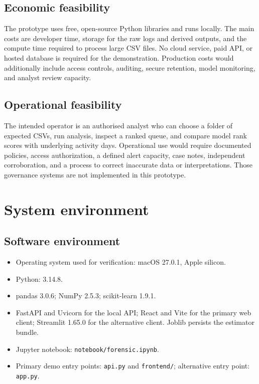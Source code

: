 \documentclass[12pt,a4paper,oneside]{report}
\begin{document}
\subsection{Economic feasibility}
The prototype uses free, open-source Python libraries and runs locally.
The main costs are developer time, storage for the raw logs and derived
outputs, and the compute time required to process large CSV files. No
cloud service, paid API, or hosted database is required for the
demonstration. Production costs would additionally include access
controls, auditing, secure retention, model monitoring, and analyst
review capacity.

\subsection{Operational feasibility}
The intended operator is an authorised analyst who can choose a folder
of expected CSVs, run analysis, inspect a ranked queue, and compare model
rank scores with underlying activity days. Operational use would require
documented policies, access authorization, a defined alert capacity,
case notes, independent corroboration, and a process to correct
inaccurate data or interpretations. Those governance systems are not
implemented in this prototype.

\section{System environment}
\subsection{Software environment}
\begin{itemize}
  \item Operating system used for verification: macOS 27.0.1, Apple
        silicon.
  \item Python: 3.14.8.
  \item pandas 3.0.6; NumPy 2.5.3; scikit-learn 1.9.1.
  \item FastAPI and Uvicorn for the local API; React and Vite for the
        primary web client; Streamlit 1.65.0 for the alternative client.
        Joblib persists the estimator bundle.
  \item Jupyter notebook: \texttt{notebook/forensic.ipynb}.
  \item Primary demo entry points: \texttt{api.py} and
        \texttt{frontend/}; alternative entry point:
        \texttt{app.py}.
\end{itemize}
\end{document}
